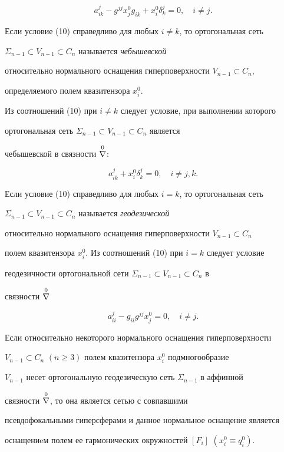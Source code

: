 \begin{equation} 


a^j_{ik}-g^{jj}x^0_j g_{ik}+x^0_i \delta^j_k=0,\quad i\ne j. 


\end{equation} 


 


Если условие (10) справедливо для любых $i\ne k$, то ортогональная сеть 


$\Sigma_{n-1}\subset V_{n-1}\subset C_n$ называется {\it чебышевской} 


относительно нормального оснащения гиперповерхности $V_{n-1}\subset C_n$, 


определяемого полем квазитензора $x^0_i$. 


 


Из соотношений (10) при $i\ne k$ следует условие, при выполнении которого 


ортогональная сеть $\Sigma_{n-1}\subset V_{n-1}\subset C_n$ является 


чебышевской в связности $\overset{0}{\nabla}{}$: 


$$ 


a^j_{ik}+x^0_i \delta^j_k=0,\quad i\ne j,k. 


$$ 


 


Если условие (10) справедливо для любых $i=k$, то ортогональная сеть 


$\Sigma_{n-1}\subset V_{n-1}\subset C_n$ называется {\it геодезической} 


относительно нормального оснащения гиперповерхности $V_{n-1}\subset C_n$ 


полем квазитензора $x^0_i$. Из соотношений (10) при $i=k$ следует условие 


геодезичности ортогональной сети $\Sigma_{n-1}\subset V_{n-1}\subset C_n$ в 


связности $\overset{0}{\nabla}{}$ 


$$ 


a^j_{ii}-g_{ii}g^{jj}x^0_j=0,\quad i\ne j. 


$$ 


 


 


\begin{thm} 


Если относительно некоторого нормального оснащения гиперповерхности \linebreak


$V_{n-1}\subset C_n$ $(n\ge3)$ полем квазитензора $x^0_i$ подмногообразие 


$V_{n-1}$ несет ортогональную геодезическую сеть $\Sigma_{n-1}$ в аффинной 


связности $\overset{0}{\nabla}{}$, то она является сетью с совпавшими 


псевдофокальными гиперсферами и данное нормальное оснащение является 


оснащениeм полем ее гармонических окружностей $[F_i]$ $(x^0_i\equiv q^0_i)$. 


\end{thm} 


